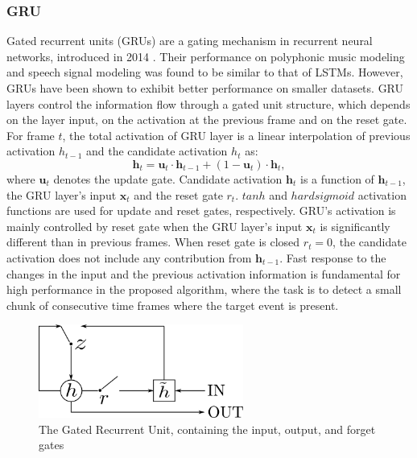 \subsubsection{GRU} Gated recurrent units (GRUs) are a gating mechanism in recurrent neural networks, introduced in 2014 \cite{chung2014empirical}. Their performance on polyphonic music modeling and speech signal modeling was found to be similar to that of LSTMs. However, GRUs have been shown to exhibit better performance on smaller datasets. 
GRU layers control the information flow through a gated unit structure, which depends on the layer input, on the activation at the previous frame and on the reset gate.
For frame $t$, the total activation of GRU layer is a linear interpolation of previous activation $h_{t-1}$ and the candidate activation $h_t$ as:
\begin{equation}
\boldsymbol{h}_t  = \boldsymbol{u}_t  \cdot \boldsymbol{h}_{t-1}  + (1 - \boldsymbol{u}_t ) \cdot \boldsymbol{h}_t ,
\end{equation}
where $\boldsymbol{u}_t$ denotes the update gate. 
Candidate activation $\boldsymbol{h}_t$ is a function of $ \boldsymbol{h}_{t-1}$, the GRU layer’s input  $\boldsymbol{x}_{t}$ and the reset gate ${r}_{t}$. $tanh$ and $hard sigmoid$ activation functions are used for update and reset gates, respectively.
GRU's activation is mainly controlled by reset gate when the GRU layer’s input $\boldsymbol{x}_{t}$ is significantly different than in previous frames. When reset gate is closed $r_{t} = 0$, the candidate activation does not include any contribution from $\boldsymbol{h}_{t-1}$. 
Fast response to the changes in the input and the previous activation information is fundamental for high performance in the proposed algorithm, where the task is to detect a small chunk of consecutive time frames where the target event is present. 

\begin{figure}[h]
	\centering
	\includegraphics[width=0.6\textwidth]{img/GRU.png}
	\caption[GRU]{The Gated Recurrent Unit, containing the input, output, and forget gates}
	\label{fig:lstm}
\end{figure}



